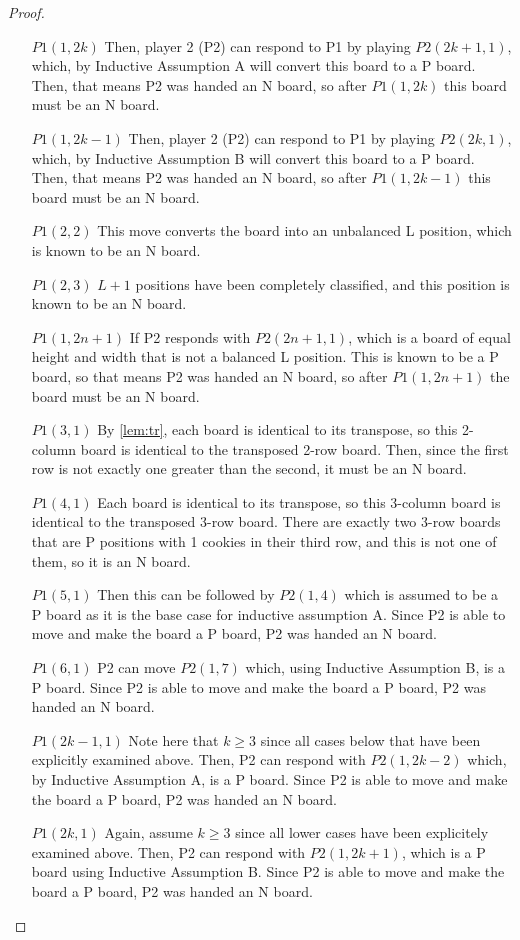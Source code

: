 \documentclass[a4paper,11pt,oneside]{article}
\begin{document}
\begin{proof}
\begin{itemize}
	\item [$P1(1, 2k)$] Then, player 2 (P2) can respond to P1 by playing $P2(2k+1,1)$, which, by Inductive Assumption A will convert this board to a P board.  Then, that means P2 was handed an N board, so after $P1(1,2k)$ this board must be an N board.
	\item [$P1(1, 2k-1)$] Then, player 2 (P2) can respond to P1 by playing $P2(2k,1)$, which, by Inductive Assumption B will convert this board to a P board.  Then, that means P2 was handed an N board, so after $P1(1,2k-1)$ this board must be an N board.
	\item [$P1(2,2)$] This move converts the board into an unbalanced L position, which is known to be an N board.
	\item [$P1(2, 3)$] $L+1$ positions have been completely classified, and this position is known to be an N board.
	\item [$P1(1, 2n+1)$] If P2 responds with $P2(2n+1, 1)$, which is a board of equal height and width that is not a balanced L position.  This is known to be a P board, so that means P2 was handed an N board, so after $P1(1, 2n+1)$ the board must be an N board.
	\item [$P1(3, 1)$] By \ref{lem:tr}, each board is identical to its transpose, so this 2-column board is identical to the transposed 2-row board.  Then, since the first row is not exactly one greater than the second, it must be an N board.
	\item[$P1(4,1)$] Each board is identical to its transpose, so this 3-column board is identical to the transposed 3-row board.  There are exactly two 3-row boards that are P positions with 1 cookies in their third row, and this is not one of them, so it is an N board.
	\item[$P1(5, 1)$] Then this can be followed by $P2(1,4)$ which is assumed to be a P board as it is the base case for inductive assumption A.  Since P2 is able to move and make the board a P board, P2 was handed an N board.
	\item [$P1(6,1)$] P2 can move $P2(1,7)$ which, using Inductive Assumption B, is a P board.  Since P2 is able to move and make the board a P board, P2 was handed an N board.
	\item [$P1(2k-1, 1)$] Note here that $k\geq 3$ since all cases below that have been explicitly examined above.  Then, P2 can respond with $P2(1, 2k-2)$ which, by Inductive Assumption A, is a P board.  Since P2 is able to move and make the board a P board, P2 was handed an N board.
	\item [$P1(2k, 1)$] Again, assume $k\geq 3$ since all lower cases have been explicitely examined above.  Then, P2 can respond with $P2(1,2k+1)$, which is a P board using Inductive Assumption B.  Since P2 is able to move and make the board a P board, P2 was handed an N board.

\end{itemize}
\end{proof}
\end{document}
